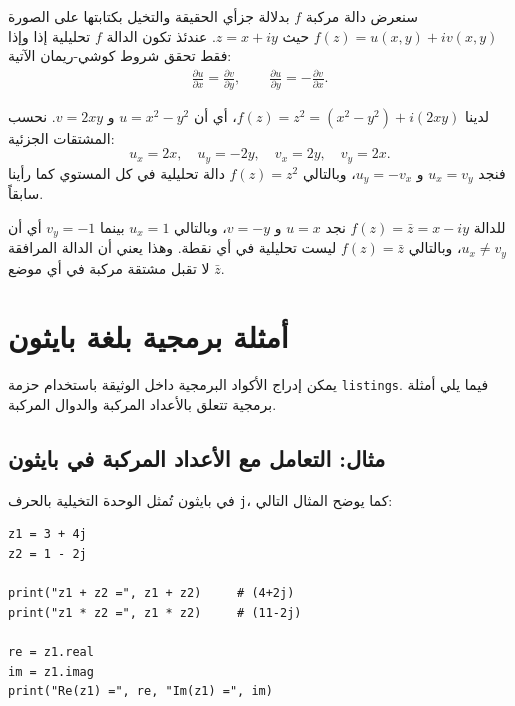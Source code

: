 سنعرض دالة مركبة $f$ بدلالة جزأي الحقيقة والتخيل بكتابتها على الصورة $f(z) = u(x,y) + i v(x,y)$ حيث $z = x + iy$. عندئذ تكون الدالة $f$ تحليلية إذا وإذا فقط تحقق شروط كوشي-ريمان الآتية:
\begin{align*}
  \frac{\partial u}{\partial x} = \frac{\partial v}{\partial y}, \qquad
  \frac{\partial u}{\partial y} = -\frac{\partial v}{\partial x}.
\end{align*}

\begin{example}
لدينا $f(z) = z^2 = (x^2 - y^2) + i(2xy)$، أي أن $u = x^2 - y^2$ و $v = 2xy$. نحسب المشتقات الجزئية:
\[
  u_x = 2x, \quad u_y = -2y, \quad v_x = 2y, \quad v_y = 2x.
\]
فنجد $u_x = v_y$ و $u_y = -v_x$، وبالتالي $f(z) = z^2$ دالة تحليلية في كل المستوي كما رأينا سابقاً.
\end{example}

\begin{example}
للدالة $f(z) = \bar{z} = x - iy$ نجد $u = x$ و $v = -y$، وبالتالي $u_x = 1$ بينما $v_y = -1$ أي أن $u_x \neq v_y$، وبالتالي $f(z) = \bar{z}$ ليست تحليلية في أي نقطة. وهذا يعني أن الدالة المرافقة $\bar{z}$ لا تقبل مشتقة مركبة في أي موضع.
\end{example}

\section{أمثلة برمجية بلغة بايثون}

يمكن إدراج الأكواد البرمجية داخل الوثيقة باستخدام حزمة \texttt{listings}. فيما يلي أمثلة برمجية تتعلق بالأعداد المركبة والدوال المركبة.

\subsection{مثال: التعامل مع الأعداد المركبة في بايثون}

في بايثون تُمثل الوحدة التخيلية بالحرف \texttt{j}، كما يوضح المثال التالي:
\begin{otherlanguage}{english}
\begin{lstlisting}[caption={Adding two complex numbers in Python}]
z1 = 3 + 4j
z2 = 1 - 2j

print("z1 + z2 =", z1 + z2)     # (4+2j)
print("z1 * z2 =", z1 * z2)     # (11-2j)

re = z1.real
im = z1.imag
print("Re(z1) =", re, "Im(z1) =", im)
\end{lstlisting}
\end{otherlanguage}

